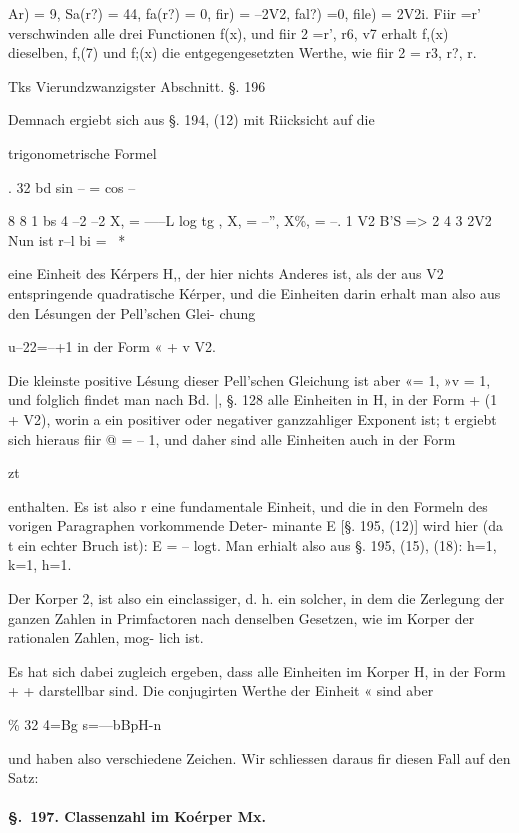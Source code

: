 \documentclass[12pt,a4paper]{article}
\theoremstyle{plain}
\theoremstyle{definition}
\begin{document}
Ar) = 9, Sa(r?) = 44, fa(r?) = 0, fir) = --2V2, fal?) =0, file) = 2V2i. Fiir =r' verschwinden alle drei Functionen f(x), und fiir 2 =r', r6, v7 erhalt f,(x) dieselben, f,(7) und f;(x) die entgegengesetzten Werthe, wie fiir 2 = r3, r?, r.

Tks Vierundzwanzigster Abschnitt. §. 196

Demnach ergiebt sich aus §. 194, (12) mit Riicksicht auf die

trigonometrische Formel

. 32 bd sin -- = cos --

8 8 1 bs 4 --2 --2 X, = -----L log tg \texttrademark , X, = --'', X\%, = --. 1 V2 B'S => 2 4 3 2V2 Nun ist r--l bi =~ *

eine Einheit des Kérpers H,, der hier nichts Anderes ist, als der aus V2 entspringende quadratische Kérper, und die Einheiten darin erhalt man also aus den Lésungen der Pell'schen Glei- chung

u--22=--+1 in der Form « + v V2.

Die kleinste positive Lésung dieser Pell'schen Gleichung ist aber «= 1, »v = 1, und folglich findet man nach Bd. |, §. 128 alle Einheiten in H, in der Form + (1 + V2), worin a ein positiver oder negativer ganzzahliger Exponent ist; t ergiebt sich hieraus fiir @ = -- 1, und daher sind alle Einheiten auch in der Form

zt

enthalten. Es ist also r eine fundamentale Einheit, und die in den Formeln des vorigen Paragraphen vorkommende Deter- minante E [§. 195, (12)] wird hier (da t ein echter Bruch ist): E = -- logt. Man erhialt also aus §. 195, (15), (18): h=1, k=1, h=1.

Der Korper 2, ist also ein einclassiger, d. h. ein solcher, in dem die Zerlegung der ganzen Zahlen in Primfactoren nach denselben Gesetzen, wie im Korper der rationalen Zahlen, mog- lich ist.

Es hat sich dabei zugleich ergeben, dass alle Einheiten im Korper H, in der Form + + darstellbar sind. Die conjugirten Werthe der Einheit « sind aber

\% 32 4=Bg s=---bBpH-n

und haben also verschiedene Zeichen. Wir schliessen daraus fir diesen Fall auf den Satz:

\paragraph{\S.~197. Classenzahl im Koérper Mx.}
\end{document}
